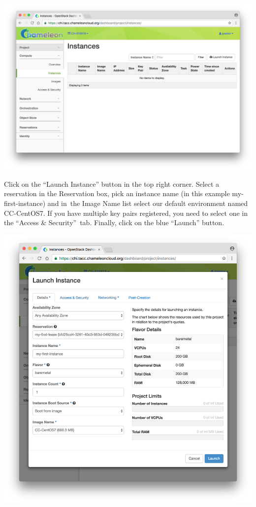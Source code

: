 \includegraphics[width=\columnwidth]{images/chameleon/Screen-Shot-2016-10-26-at-14-39-56.png}

Click on the ``Launch Instance'' button in the top right corner. Select
a reservation in the Reservation box, pick an instance name (in this
example my-first-instance) and in~the Image Name list select our default
environment named CC-CentOS7. If you have multiple key pairs registered,
you need to select one in the ``Access \& Security''~tab. Finally, click
on the blue ``Launch'' button.

\includegraphics[width=\columnwidth]{images/chameleon/Screen-Shot-2016-10-26-at-14-41-08.png}

